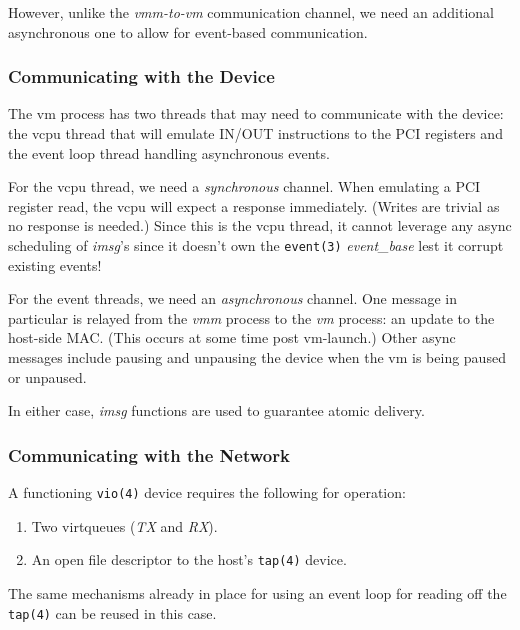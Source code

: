 \documentclass[conference]{IEEEtran}
\begin{document}
However, unlike the \emph{vmm-to-vm} communication channel, we need an
additional asynchronous one to allow for event-based communication.


\vspace{2mm}
\subsubsection{Communicating with the Device}
The vm process has two threads that may need to communicate with the
device: the vcpu thread that will emulate IN/OUT instructions to the
PCI registers and the event loop thread handling asynchronous events.

For the vcpu thread, we need a \emph{synchronous} channel. When
emulating a PCI register read, the vcpu will expect a response
immediately. (Writes are trivial as no response is needed.) Since this
is the vcpu thread, it cannot leverage any async scheduling of
\emph{imsg}'s since it doesn't own the \texttt{event(3)}
\emph{event\_base} lest it corrupt existing events!

For the event threads, we need an \emph{asynchronous} channel. One
message in particular is relayed from the \emph{vmm} process to the
\emph{vm} process: an update to the host-side MAC. (This occurs at
some time post vm-launch.) Other async messages include pausing and
unpausing the device when the vm is being paused or unpaused.

In either case, \emph{imsg} functions are used to guarantee atomic
delivery.

\vspace{2mm}
\subsubsection{Communicating with the Network}
A functioning \texttt{vio(4)} device requires the following for
operation:

\vspace{2mm}
\begin{enumerate}
  \item Two virtqueues (\emph{TX} and \emph{RX}).
  \item An open file descriptor to the host's \texttt{tap(4)} device.
\end{enumerate}
\vspace{2mm}

The same mechanisms already in place for using an event loop for
reading off the \texttt{tap(4)} can be reused in this case.


\vspace{3mm}
\end{document}

